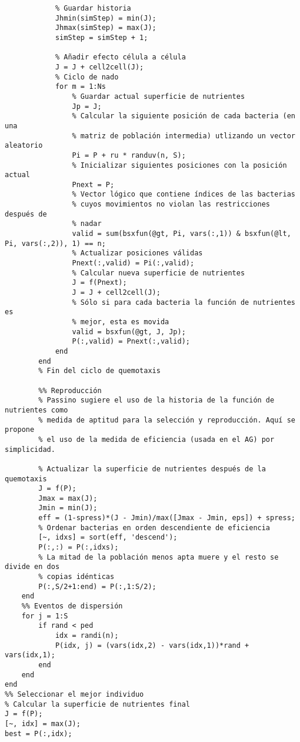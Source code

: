 \begin{scriptsize}
\begin{verbatim}
            % Guardar historia
            Jhmin(simStep) = min(J);
            Jhmax(simStep) = max(J);
            simStep = simStep + 1;
            
            % Añadir efecto célula a célula
            J = J + cell2cell(J);                       
            % Ciclo de nado
            for m = 1:Ns
                % Guardar actual superficie de nutrientes
                Jp = J; 
                % Calcular la siguiente posición de cada bacteria (en una
                % matriz de población intermedia) utlizando un vector aleatorio
                Pi = P + ru * randuv(n, S);
                % Inicializar siguientes posiciones con la posición actual
                Pnext = P;
                % Vector lógico que contiene índices de las bacterias
                % cuyos movimientos no violan las restricciones después de
                % nadar
                valid = sum(bsxfun(@gt, Pi, vars(:,1)) & bsxfun(@lt, Pi, vars(:,2)), 1) == n;
                % Actualizar posiciones válidas
                Pnext(:,valid) = Pi(:,valid);
                % Calcular nueva superficie de nutrientes
                J = f(Pnext);
                J = J + cell2cell(J);
                % Sólo si para cada bacteria la función de nutrientes es
                % mejor, esta es movida
                valid = bsxfun(@gt, J, Jp);
                P(:,valid) = Pnext(:,valid);
            end
        end
        % Fin del ciclo de quemotaxis
        
        %% Reproducción
        % Passino sugiere el uso de la historia de la función de nutrientes como
        % medida de aptitud para la selección y reproducción. Aquí se propone
        % el uso de la medida de eficiencia (usada en el AG) por simplicidad.
        
        % Actualizar la superficie de nutrientes después de la quemotaxis
        J = f(P);
        Jmax = max(J);
        Jmin = min(J);
        eff = (1-spress)*(J - Jmin)/max([Jmax - Jmin, eps]) + spress;
        % Ordenar bacterias en orden descendiente de eficiencia
        [~, idxs] = sort(eff, 'descend');
        P(:,:) = P(:,idxs);
        % La mitad de la población menos apta muere y el resto se divide en dos
        % copias idénticas
        P(:,S/2+1:end) = P(:,1:S/2);
    end
    %% Eventos de dispersión
    for j = 1:S
        if rand < ped
            idx = randi(n);
            P(idx, j) = (vars(idx,2) - vars(idx,1))*rand + vars(idx,1);
        end
    end  
end
%% Seleccionar el mejor individuo
% Calcular la superficie de nutrientes final
J = f(P);
[~, idx] = max(J);
best = P(:,idx);


\end{verbatim}
\end{scriptsize}
